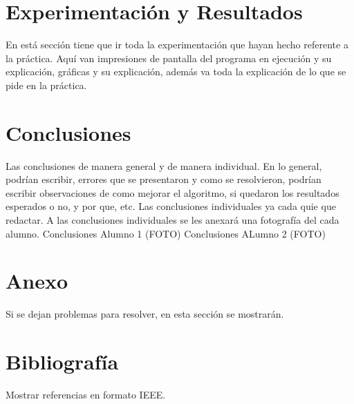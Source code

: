 \documentclass[12pt,twoside]{article}
\begin{document}
\section{Experimentaci\'on y Resultados}
En est\'a secci\'on tiene que ir toda la experimentaci\'on que hayan hecho referente a la
pr\'actica. Aqu\'i van impresiones de pantalla del programa en ejecuci\'on y su explicaci\'on,
gr\'aficas y su explicaci\'on, adem\'as va toda la explicaci\'on de lo que se pide en la
pr\'actica.
\section{Conclusiones}
Las conclusiones de manera general y de manera individual. En lo general, podr\'ian escribir,
errores que se presentaron y como se resolvieron, podr\'ian escribir observaciones de como
mejorar el algoritmo, si quedaron los resultados esperados o no, y por que, etc.
Las conclusiones individuales ya cada quie  que redactar. A las conclusiones individuales
se les anexar\'a una fotografía del cada alumno.
Conclusiones Alumno 1 (FOTO)
Conclusiones ALumno 2 (FOTO)
\section{Anexo}
Si se dejan problemas para resolver, en esta secci\'on se mostrar\'an.
\section{Bibliograf\'ia}
Mostrar referencias en formato IEEE.
\end{document}
